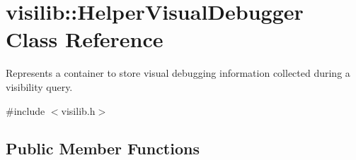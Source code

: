 \hypertarget{classvisilib_1_1_helper_visual_debugger}{}\section{visilib\+::Helper\+Visual\+Debugger Class Reference}
\label{classvisilib_1_1_helper_visual_debugger}


Represents a container to store visual debugging information collected during a visibility query.  




{\ttfamily \#include $<$visilib.\+h$>$}

\subsection*{Public Member Functions}
